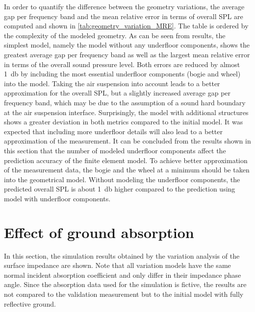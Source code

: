 In order to quantify the difference between the geometry variations, the average gap per frequency band and the mean relative error in terms of overall SPL are computed and shown in \cref{tab:geometry_variation_MRE}. The table is ordered by the complexity of the modeled geometry. As can be seen from results, the simplest model, namely the model without any underfloor components, shows the greatest average gap per frequency band as well as the largest mean relative error in terms of the overall sound pressure level. Both errors are reduced by almost \SI{1}{\decibel} by including the most essential underfloor components (bogie and wheel) into the model. Taking the air suspension into account leads to a better approximation for the overall SPL, but a slightly increased average gap per frequency band, which may be due to the assumption of a sound hard boundary at the air suspension interface. Surprisingly, the model with additional structures shows a greater deviation in both metrics compared to the initial model. It was expected that including more underfloor details will also lead to a better approximation of the measurement. It can be concluded from the results shown in this section that the number of modeled underfloor components affect the prediction accuracy of the finite element model. To achieve better approximation of the measurement data, the bogie and the wheel at a minimum should be taken into the geometrical model. Without modeling the underfloor components, the predicted overall SPL is about \SI{1}{\decibel} higher compared to the prediction using model with underfloor components.

\section{Effect of ground absorption}

In this section, the simulation results obtained by the variation analysis of the surface impedance are shown. Note that all variation models have the same normal incident absorption coefficient and only differ in their impedance phase angle. Since the absorption data used for the simulation is fictive, the results are not compared to the validation measurement but to the initial model with fully reflective ground.

